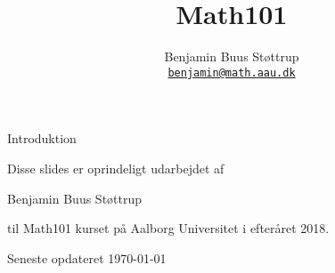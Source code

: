 \documentclass[aspectratio=169,10pt]{beamer}
\title{Math101}
\date{}
\author{Benjamin Buus Støttrup\\
   \href{mailto:benjamin@math.aau.dk}{{\tt benjamin@math.aau.dk}}
}
\institute[
  Institut for matematiske fag\\
  Aalborg universitet\\
  Danmark
] %
{%
  Institut for matematiske fag\\
  Aalborg universitet\\
  Danmark\\
  
}
\begin{document}
{\aauwavesbg%
\begin{frame} %
  \titlepage
\end{frame}}

\begin{frame}{Introduktion}{}
\begin{center}
 {\Large  Disse slides er oprindeligt udarbejdet af
 \vspace{1cm}

  Benjamin Buus Støttrup
  \vspace{1cm}

  til Math101 kurset på Aalborg Universitet i efteråret 2018. }
\vspace{0.5cm}

Seneste opdateret \today 

\end{center}
\vfill
\doclicenseThis
\end{frame}
% 
% 
% 
% 
% 
% 
% 




{\aauwavesbg
\begin{frame}
\end{frame}}
\end{document}
